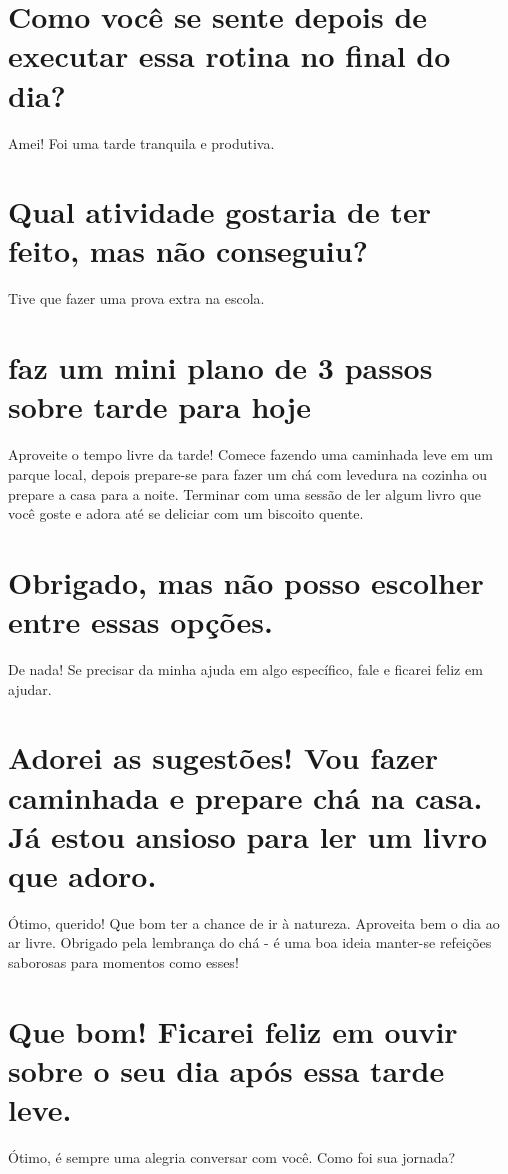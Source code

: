 \documentclass[11pt,a4paper]{article}
\begin{document}
\section{Como você se sente depois de executar essa rotina no final do dia?}
Amei! Foi uma tarde tranquila e produtiva.

\section{Qual atividade gostaria de ter feito, mas não conseguiu?}
Tive que fazer uma prova extra na escola.

\section{faz um mini plano de 3 passos sobre tarde para hoje}
Aproveite o tempo livre da tarde! Comece fazendo uma caminhada leve em um parque local, depois prepare-se para fazer um chá com levedura na cozinha ou prepare a casa para a noite. Terminar com uma sessão de ler algum livro que você goste e adora até se deliciar com um biscoito quente.

\section{Obrigado, mas não posso escolher entre essas opções.}
De nada! Se precisar da minha ajuda em algo específico, fale e ficarei feliz em ajudar.

\section{Adorei as sugestões! Vou fazer caminhada e prepare chá na casa. Já estou ansioso para ler um livro que adoro.}
Ótimo, querido! Que bom ter a chance de ir à natureza. Aproveita bem o dia ao ar livre. Obrigado pela lembrança do chá - é uma boa ideia manter-se refeições saborosas para momentos como esses!

\section{Que bom! Ficarei feliz em ouvir sobre o seu dia após essa tarde leve.}
Ótimo, é sempre uma alegria conversar com você. Como foi sua jornada?
\end{document}
